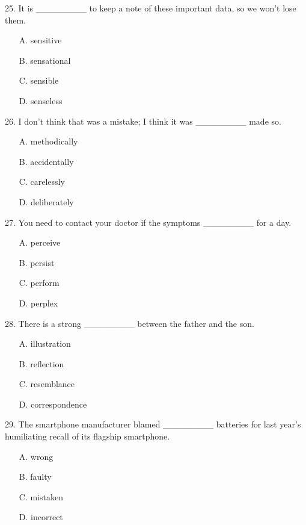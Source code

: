 \documentclass[UTF8,11pt]{ctexart}
\begin{document}
25. It is \_\_\_\_\_\_\_\_ to keep a note of these important data, so we won’t lose them.


\begin{itemize}[leftmargin=2em,itemsep=.2em,topsep=.4em]\item[A.] sensitive
\item[B.] sensational
\item[C.] sensible
\item[D.] senseless
\end{itemize}

26. I don’t think that was a mistake; I think it was \_\_\_\_\_\_\_\_ made so.


\begin{itemize}[leftmargin=2em,itemsep=.2em,topsep=.4em]\item[A.] methodically
\item[B.] accidentally
\item[C.] carelessly
\item[D.] deliberately
\end{itemize}

27. You need to contact your doctor if the symptoms \_\_\_\_\_\_\_\_ for a day.


\begin{itemize}[leftmargin=2em,itemsep=.2em,topsep=.4em]\item[A.] perceive
\item[B.] persist
\item[C.] perform
\item[D.] perplex
\end{itemize}

28. There is a strong \_\_\_\_\_\_\_\_ between the father and the son.


\begin{itemize}[leftmargin=2em,itemsep=.2em,topsep=.4em]\item[A.] illustration
\item[B.] reflection
\item[C.] resemblance
\item[D.] correspondence
\end{itemize}

29. The smartphone manufacturer blamed \_\_\_\_\_\_\_\_ batteries for last year’s humiliating recall of its flagship smartphone.


\begin{itemize}[leftmargin=2em,itemsep=.2em,topsep=.4em]\item[A.] wrong
\item[B.] faulty
\item[C.] mistaken
\item[D.] incorrect
\end{itemize}
\end{document}
